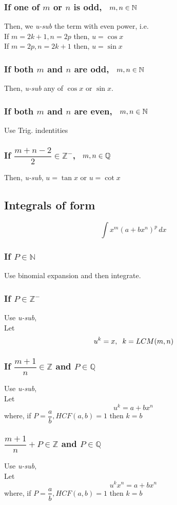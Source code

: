 \documentclass{article}
\begin{document}
\subsubsection{If one of $m$ or $n$ is odd, $\hspace{2mm} m,n \in \mathbb{N}$ }
Then, we \textit{u-sub} the term with even power, i.e.
\\
If $m=2k+1, n=2p$ then, $u=\cos x$ \\
If $m=2p, n=2k+1$ then, $u=\sin x$
\subsubsection{If both $m$ and $n$ are odd, $\hspace{2mm} m,n \in \mathbb{N}$}
Then, \textit{u-sub} any of $\cos x$ or $\sin x$.
\subsubsection{If both $m$ and $n$ are even, $\hspace{2mm} m,n \in \mathbb{N}$}
Use Trig. indentities
\subsubsection{If $\dfrac{m+n-2}{2} \in \mathbb{Z^-}$, $\hspace{2mm} m,n \in \mathbb{Q}$}
Then, \textit{u-sub}, $u=\tan x$ or $u=\cot x$
\subsection{Integrals of form }
$$\displaystyle\int x^m (a+bx^n)^p \, dx$$
\subsubsection{If $P \in \mathbb{N}$}
Use binomial expansion and then integrate.
\subsubsection{If $P \in \mathbb{Z^-}$}
Use \textit{u-sub}, 
\\
Let $$u^k=x, \hspace{2mm} k = LCM(m,n)$$
\subsubsection{If $\dfrac{m+1}{n} \in \mathbb{Z}$ and $P \in \mathbb{Q}$}
Use \textit{u-sub}, 
\\
Let $$u^k=a+bx^n$$
where, if $P=\dfrac{a}{b}, HCF(a,b)=1$ then $k=b$
\subsubsection{$\dfrac{m+1}{n}+P \in \mathbb{Z}$ and $P \in \mathbb{Q}$}
Use \textit{u-sub}, 
\\
Let $$u^kx^n=a+bx^n$$
where, if $P=\dfrac{a}{b}, HCF(a,b)=1$ then $k=b$
\end{document}
